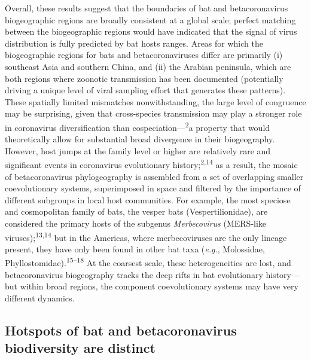 \documentclass[10pt,oneside]{article}
\begin{document}
Overall, these results suggest that the boundaries of bat and
betacoronavirus biogeographic regions are broadly consistent at a global
scale; perfect matching between the biogeographic regions would have
indicated that the signal of virus distribution is fully predicted by
bat hosts ranges. Areas for which the biogeographic regions for bats and
betacoronaviruses differ are primarily (i) southeast Asia and southern
China, and (ii) the Arabian peninsula, which are both regions where
zoonotic transmission has been documented (potentially driving a unique
level of viral sampling effort that generates these patterns). These
spatially limited mismatches nonwithstanding, the large level of
congruence may be surprising, given that cross-species transmission may
play a stronger role in coronavirus diversification than
cospeciation---\textsuperscript{2}a property that would theoretically
allow for substantial broad divergence in their biogeography. However,
host jumps at the family level or higher are relatively rare and
significant events in coronavirus evolutionary
history;\textsuperscript{2,14} as a result, the mosaic of
betacoronavirus phylogeography is assembled from a set of overlapping
smaller coevolutionary systems, superimposed in space and filtered by
the importance of different subgroups in local host communities. For
example, the most speciose and cosmopolitan family of bats, the vesper
bats (Vespertilionidae), are considered the primary hosts of the
subgenus \emph{Merbecovirus} (MERS-like viruses);\textsuperscript{13,14}
but in the Americas, where merbecoviruses are the only lineage present,
they have only been found in other bat taxa (\emph{e.g.}, Molossidae,
Phyllostomidae).\textsuperscript{15--18} At the coarsest scale, these
heterogeneities are lost, and betacoronavirus biogeography tracks the
deep rifts in bat evolutionary history---but within broad regions, the
component coevolutionary systems may have very different dynamics.

\hypertarget{hotspots-of-bat-and-betacoronavirus-biodiversity-are-distinct}{%
\subsection{Hotspots of bat and betacoronavirus biodiversity are
distinct}\label{hotspots-of-bat-and-betacoronavirus-biodiversity-are-distinct}}
\end{document}
